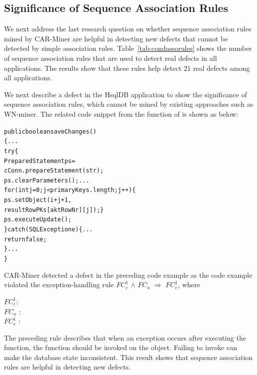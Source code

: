 \subsection{Significance of Sequence Association Rules}
\vspace*{-2ex}
We next address the last research question on whether sequence association rules 
mined by CAR-Miner are helpful in detecting new defects that cannot be detected
by simple association rules. Table~\ref{tab:condassorules}
shows the number of sequence association rules that are used to detect real defects
in all applications. The results show that these rules help detect $21$ real defects among
all applications. 

We next describe a defect in the HsqlDB application to show the significance
of sequence association rules, which cannot be mined by existing approaches such as WN-miner.
The related code snippet from the  function of  is shown as 
below:
\vspace*{-1ex}
\begin{CodeOut}
\begin{alltt}
public boolean saveChanges() 
\{ ...
\hspace*{0.1in}try \{ 
\hspace*{0.2in}PreparedStatement ps = 
\hspace*{0.5in}cConn.prepareStatement(str);
\hspace*{0.2in}ps.clearParameters(); ...
\hspace*{0.2in}for (int j=0; j<primaryKeys.length; j++)\{
\hspace*{0.3in}ps.setObject(i + j + 1, 
\hspace*{0.5in}resultRowPKs[aktRowNr][j]); \}
\hspace*{0.2in}ps.executeUpdate();
\hspace*{0.1in}\} catch (SQLException e) \{ ...
\hspace*{0.3in}return false; 
\hspace*{0.1in}\} ...
\}
\end{alltt}
\end{CodeOut}
\vspace*{-1ex}
CAR-Miner detected a defect in the preceding code example as the code example violated the exception-handling rule
$FC_c^1$ $\wedge$ $FC_a$ $\Rightarrow$ $FC_e^1$, where

$FC_c^1$:\\
\hspace*{0.15in}$FC_a$ :\\
\hspace*{0.15in}$FC_e^1$ :\\
\vspace*{-1ex}

The preceding rule describes that when an exception occurs after executing the  function, the  function should be invoked on the  object. Failing to invoke 
 can make the database state inconsistent. This result shows that sequence
association rules are helpful in detecting new defects.